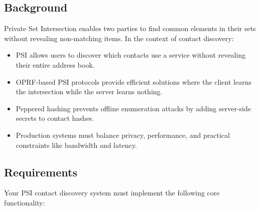 \documentclass[10pt,a4paper,american]{exam}
\begin{document}
\subsection*{Background}
Private Set Intersection enables two parties to find common elements in their sets without revealing non-matching items. In the context of contact discovery:
\begin{itemize}
	\item PSI allows users to discover which contacts use a service without revealing their entire address book.
	\item OPRF-based PSI protocols provide efficient solutions where the client learns the intersection while the server learns nothing.
	\item Peppered hashing prevents offline enumeration attacks by adding server-side secrets to contact hashes.
	\item Production systems must balance privacy, performance, and practical constraints like bandwidth and latency.
\end{itemize}

\subsection*{Requirements}
Your PSI contact discovery system must implement the following core functionality:
\end{document}
